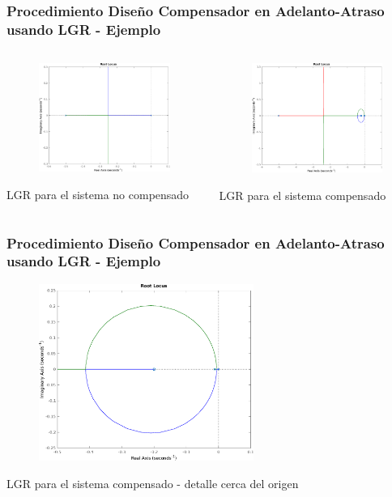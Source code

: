 \documentclass[aspectratio=169,handout]{beamer}
\theoremstyle{definition}
\theoremstyle{plain}
\theoremstyle{remark}
\begin{document}
\begin{frame}[<+->]\frametitle{Procedimiento Diseño Compensador en Adelanto-Atraso usando LGR - Ejemplo}
\begin{columns}
	\begin{column}{0.5\textwidth}
		\begin{figure}
			\includegraphics[width=7cm]{images/ejemplo3_LGR_uncomp.eps}
		\end{figure}
		\centering \small LGR para el sistema no compensado
	\end{column}
	\begin{column}{0.5\textwidth}
		\begin{figure}
			\includegraphics[width=7cm]{images/ejemplo3_LGR_comp.eps}
		\end{figure}
		\centering \small LGR para el sistema compensado
	\end{column}
\end{columns}	
\end{frame}

\begin{frame}[<+->]\frametitle{Procedimiento Diseño Compensador en Adelanto-Atraso usando LGR - Ejemplo}
	\begin{figure}
		\includegraphics[width=7cm]{images/ejemplo3_LGR_comp_detalle.eps}
	\end{figure}
	\centering \small LGR para el sistema compensado - detalle cerca del origen
\end{frame}
\end{document}
